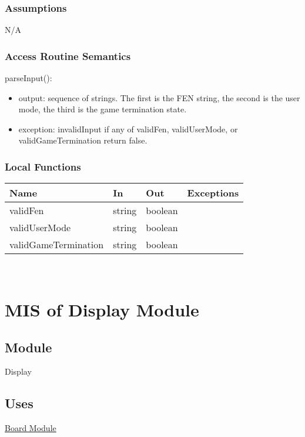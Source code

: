 \documentclass[12pt, titlepage]{article}
\begin{document}
    \subsubsection{Assumptions}
    N/A

    \subsubsection{Access Routine Semantics}
        \noindent parseInput():
        \begin{itemize}
        \item output: sequence of strings. The first is the FEN string, the second is 
            the user mode, the third is the game termination state.
        \item exception: invalidInput if any of validFen, validUserMode, 
            or validGameTermination return false.
        \end{itemize}

    \subsubsection{Local Functions}
        \begin{center}
        \begin{tabular}{p{4.5cm} p{3cm} p{4cm} p{2.5cm}}
        \hline
        \textbf{Name} & \textbf{In} & \textbf{Out} & \textbf{Exceptions} \\
        \hline
        validFen & string & boolean & \\
        \hline
        validUserMode & string & boolean & \\
        \hline
        validGameTermination & string & boolean & \\
        \end{tabular}
        \end{center}
    
        ~\newpage

\section{MIS of Display Module} \label{mDisplay}

    \subsection{Module}
    Display

    \subsection{Uses}
    \hyperref[mBoard]{Board Module}
\end{document}
